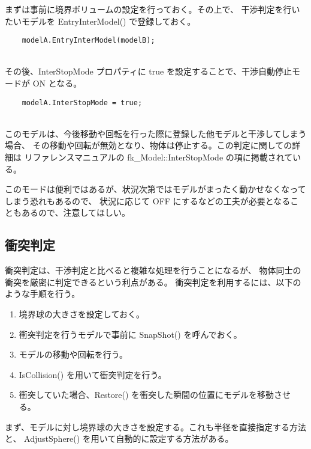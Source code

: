 まずは事前に境界ボリュームの設定を行っておく。その上で、
干渉判定を行いたいモデルを EntryInterModel() で登録しておく。
\\
\begin{breakbox}
\begin{verbatim}
    modelA.EntryInterModel(modelB);
\end{verbatim}
\end{breakbox}
~ \\
その後、InterStopMode プロパティに true を設定することで、干渉自動停止モードが ON となる。
\\
\begin{breakbox}
\begin{verbatim}
    modelA.InterStopMode = true;
\end{verbatim}
\end{breakbox}
~ \\
このモデルは、今後移動や回転を行った際に登録した他モデルと干渉してしまう場合、
その移動や回転が無効となり、物体は停止する。この判定に関しての詳細は
リファレンスマニュアルの fk\_Model::InterStopMode の項に掲載されている。

このモードは便利ではあるが、状況次第ではモデルがまったく動かせなくなってしまう恐れもあるので、
状況に応じて OFF にするなどの工夫が必要となることもあるので、注意してほしい。

\subsection{衝突判定}
衝突判定は、干渉判定と比べると複雑な処理を行うことになるが、
物体同士の衝突を厳密に判定できるという利点がある。
衝突判定を利用するには、以下のような手順を行う。
\begin{enumerate}
 \item 境界球の大きさを設定しておく。
 \item 衝突判定を行うモデルで事前に SnapShot() を呼んでおく。
 \item モデルの移動や回転を行う。
 \item IsCollision() を用いて衝突判定を行う。
 \item 衝突していた場合、Restore() を衝突した瞬間の位置にモデルを移動させる。
\end{enumerate}

まず、モデルに対し境界球の大きさを設定する。これも半径を直接指定する方法と、
AdjustSphere() を用いて自動的に設定する方法がある。

